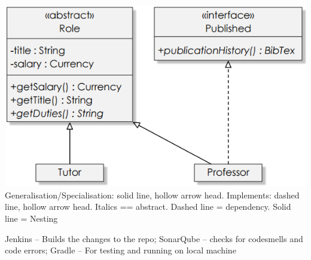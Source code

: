 \documentclass[number]{assignment}
\begin{document}
\begin{landscape}
\begin{multicols}{3}
\includegraphics[width=\linewidth]{inheritance.png}
Generalisation/Specialisation: solid line, hollow arrow head. Implements: dashed line, hollow arrow head. Italics == abstract.
Dashed line = dependency. Solid line = Nesting

Jenkins -- Builds the changes to the repo; SonarQube -- checks for codesmells and code errors; Gradle -- For testing and running on local machine\\

\end{multicols}
\end{landscape}
\end{document}
